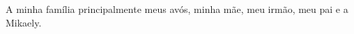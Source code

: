 \begin{dedicatoria}
   \vspace*{\fill}
   	\begin{flushright}
   \noindent
   A minha família principalmente meus avós, minha mãe, meu irmão, meu pai e a Mikaely.
   	\end{flushright}
\end{dedicatoria}
